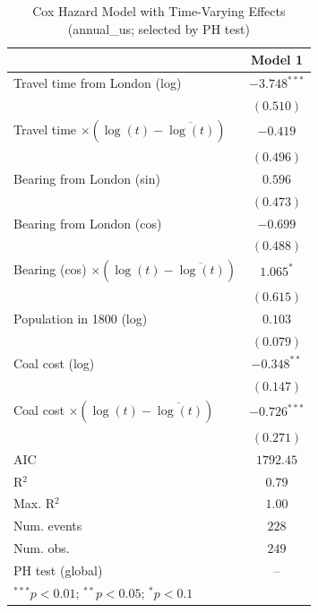 
\begin{table}
\begin{center}
\begin{tabular}{l c}
\hline
 & Model 1 \\
\hline
Travel time from London (log) & $-3.748^{***}$ \\
 & $(0.510)$ \\
Travel time $\times (\log(t)-\overline{\log(t)})$ & $-0.419$ \\
 & $(0.496)$ \\
Bearing from London (sin) & $0.596$ \\
 & $(0.473)$ \\
Bearing from London (cos) & $-0.699$ \\
 & $(0.488)$ \\
Bearing (cos) $\times (\log(t)-\overline{\log(t)})$ & $1.065^{*}$ \\
 & $(0.615)$ \\
Population in 1800 (log) & $0.103$ \\
 & $(0.079)$ \\
Coal cost (log) & $-0.348^{**}$ \\
 & $(0.147)$ \\
Coal cost $\times (\log(t)-\overline{\log(t)})$ & $-0.726^{***}$ \\
 & $(0.271)$ \\
\hline
AIC              & $1792.45$ \\
R$^2$            & $0.79$ \\
Max. R$^2$       & $1.00$ \\
Num. events      & $228$ \\
Num. obs.        & $249$ \\
PH test (global) & -- \\
\hline
\multicolumn{2}{l}{\scriptsize{$^{***}p<0.01$; $^{**}p<0.05$; $^{*}p<0.1$}}
\end{tabular}
\caption{Cox Hazard Model with Time-Varying Effects (annual\_us; selected by PH test)}
\label{tab:cox_serious_tv_annual_us}
\end{center}
\end{table}
